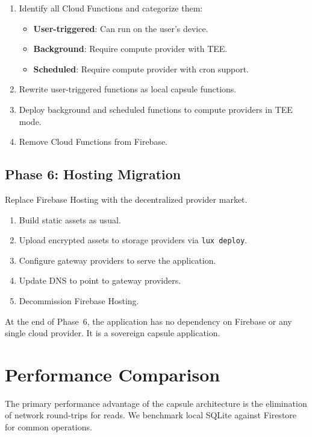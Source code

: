 \documentclass[11pt,a4paper]{article}
\begin{document}
\begin{enumerate}
    \item Identify all Cloud Functions and categorize them:
    \begin{itemize}
        \item \textbf{User-triggered}: Can run on the user's device.
        \item \textbf{Background}: Require compute provider with TEE.
        \item \textbf{Scheduled}: Require compute provider with cron support.
    \end{itemize}
    \item Rewrite user-triggered functions as local capsule functions.
    \item Deploy background and scheduled functions to compute providers in TEE mode.
    \item Remove Cloud Functions from Firebase.
\end{enumerate}

\subsection{Phase 6: Hosting Migration}

Replace Firebase Hosting with the decentralized provider market.

\begin{enumerate}
    \item Build static assets as usual.
    \item Upload encrypted assets to storage providers via \texttt{lux deploy}.
    \item Configure gateway providers to serve the application.
    \item Update DNS to point to gateway providers.
    \item Decommission Firebase Hosting.
\end{enumerate}

At the end of Phase~6, the application has no dependency on Firebase or any
single cloud provider. It is a sovereign capsule application.

\section{Performance Comparison}\label{sec:performance}

The primary performance advantage of the capsule architecture is the
elimination of network round-trips for reads. We benchmark local SQLite
against Firestore for common operations.
\end{document}
